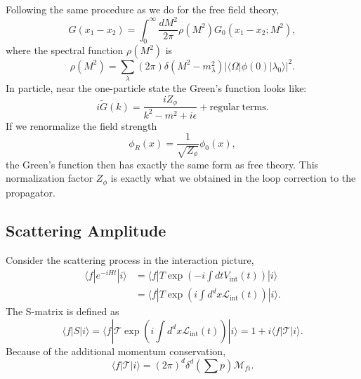 Following the same procedure as we do for the free field theory, 
\begin{equation}
	G(x_1-x_2) = \int_0^\infty \frac{dM^2}{2\pi} \rho(M^2) G_0(x_1-x_2;M^2),
\end{equation}
where the spectral function $\rho(M^2)$ is
\begin{equation*}
	\rho(M^2) = \sum_\lambda(2\pi)\delta(M^2-m_\lambda^2)|\langle\Omega|\phi(0)|\lambda_0\rangle|^2.
\end{equation*}
In particle, near the one-particle state the Green's function looks like:
\begin{equation*}
	i\tilde G(k) = \frac{iZ_{\phi}}{k^2-m^2+i\epsilon} + \mathrm{regular\ terms}.
\end{equation*}
If we renormalize the field strength 
\begin{equation*}
	\phi_R(x) = \frac{1}{\sqrt{Z_\phi}}\phi_0(x),
\end{equation*}
the Green's function then has exactly the same form as free theory.
This normalization factor $Z_\phi$ is exactly what we obtained in the loop correction to the propagator.



\subsection{Scattering Amplitude}

Consider the scattering process in the interaction picture,
\begin{equation}
\begin{aligned}
	\langle f| e^{-iHt} |i\rangle &= \langle f| T \exp \left(-i\int dt V_{\mathrm{int}}(t) \right)|i\rangle \\
	&= \langle f| T \exp \left(i\int d^d x \mathcal{L}_{\mathrm{int}}(t) \right)|i\rangle.
\end{aligned}
\end{equation}
The S-matrix is defined as
\begin{equation}
	\langle f|S|i\rangle 
	= \langle f|\mathcal{T} \exp \left(i\int d^d x \mathcal{L}_{\mathrm{int}}(t) \right)|i\rangle 
	= 1 + i \langle f|\mathcal{T}|i\rangle .
\end{equation}
Because of the additional momentum conservation,
\begin{equation}
	\langle f|\mathcal{T}|i\rangle = (2\pi)^d \delta^d\left(\sum p\right) \mathcal M_{fi}.
\end{equation}


